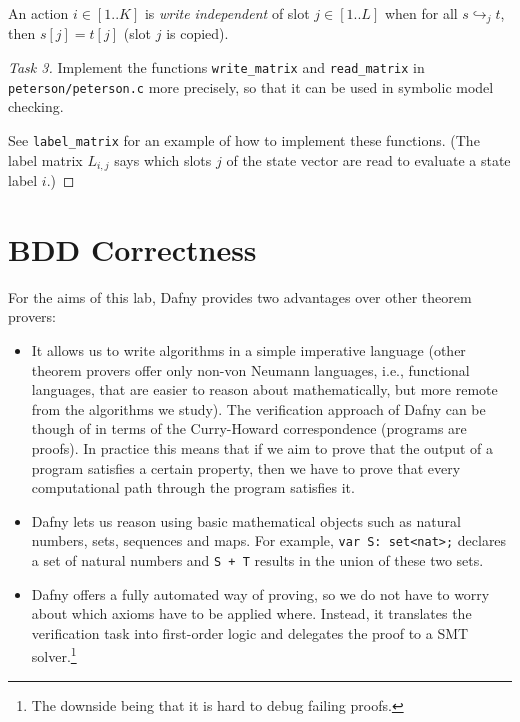 \documentclass[12pt]{article}
\begin{document}
\begin{definition}
	An action $i\in [1..K]$ is \emph{write independent} of slot $j \in [1..L]$
	when for all $s \hookrightarrow_j t$, then
	$s[j] = t[j]$ {(slot $j$ is copied)}.
\end{definition}


\begin{proof}[Task 3]
Implement the functions 
\texttt{write\_matrix} and \texttt{read\_matrix} 
in\\ \texttt{peterson/peterson.c} more precisely,
so that it can be used in symbolic model checking.

See \texttt{label\_matrix} for an example of how to implement these
functions. (The label matrix $L_{i,j}$
says which slots $j$ of the state vector are
read to evaluate a state label $i$.)
\end{proof}


\section{BDD Correctness}

For the aims of this lab, Dafny provides two advantages
over other theorem provers:
\begin{itemize}
	\item It allows us to write algorithms in a simple imperative 
	language (other theorem provers offer only non-von Neumann languages,
	i.e., functional languages, that are easier to reason about
	mathematically, but more remote from the algorithms we study).
	The verification approach of Dafny can be though of in terms of
	the Curry-Howard correspondence (programs are proofs).
	In practice this means that if we aim to prove that the output
	of a program satisfies a certain property, then we
	have to prove that every computational path through the
	program satisfies it.
	\item Dafny lets us reason using basic mathematical objects such as
	natural numbers,
	sets, sequences and maps. For example, \texttt{var S: set<nat>;} 
	declares a set of natural numbers and \texttt{S + T} results in the 
	union of these two sets.
	\item Dafny offers a fully automated way of proving, so we do not
		have to worry about which axioms have to be applied where. 
		Instead, it translates the verification task into first-order logic
		and delegates the proof to a SMT solver.\footnote{The downside being
		that it is hard to debug failing proofs.}
\end{itemize}
\end{document}
